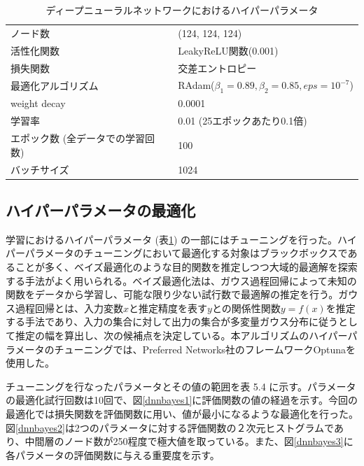 \begin{table}[H]
 \centering
  \begin{tabular}{ l  l }
   \hline
   ノード数 & (124, 124, 124)\\
   活性化関数 & LeakyReLU関数(0.001)\\
   損失関数 & 交差エントロピー\\
   最適化アルゴリズム & RAdam($\beta_1 = 0.89, \beta_2 = 0.85, eps = 10^{-7}$)\\
   weight decay & 0.0001\\
   学習率 & 0.01 (25エポックあたり0.1倍)\\
   エポック数 (全データでの学習回数) & 100\\
   バッチサイズ & 1024\\
   \hline
  \end{tabular}
  \caption{ディープニューラルネットワークにおけるハイパーパラメータ}
  \label{dnnsetting}
\end{table}
\subsection{ハイパーパラメータの最適化}
学習におけるハイパーパラメータ (表\ref{dnnsetting}) の一部にはチューニングを行った。ハイパーパラメータのチューニングにおいて最適化する対象はブラックボックスであることが多く、ベイズ最適化\cite{bayesian}のような目的関数を推定しつつ大域的最適解を探索する手法がよく用いられる。ベイズ最適化法は、ガウス過程回帰によって未知の関数をデータから学習し、可能な限り少ない試行数で最適解の推定を行う。ガウス過程回帰とは、入力変数$x$と推定精度を表す$y$との関係性関数$y = f(x)$を推定する手法であり、入力の集合に対して出力の集合が多変量ガウス分布に従うとして推定の幅を算出し、次の候補点を決定している。本アルゴリズムのハイパーパラメータのチューニングでは、Preferred Networks社のフレームワークOptuna\cite{optuna}を使用した。

チューニングを行なったパラメータとその値の範囲を表 5.4%
に示す。パラメータの最適化試行回数は10回で、図\ref{dnnbayes1}に評価関数の値の経過を示す。今回の最適化では損失関数を評価関数に用い、値が最小になるような最適化を行った。図\ref{dnnbayes2}は2つのパラメータに対する評価関数の２次元ヒストグラムであり、中間層のノード数が250程度で極大値を取っている。また、図\ref{dnnbayes3}に各パラメータの評価関数に与える重要度を示す。

